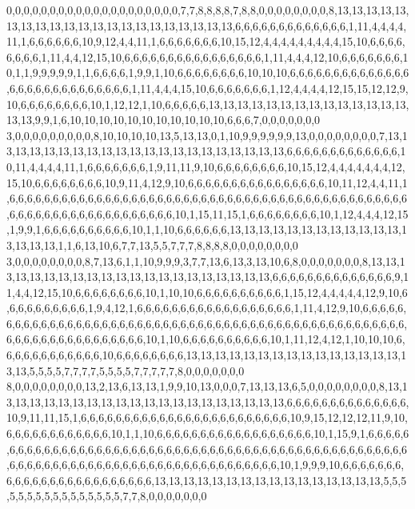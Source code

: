 0,0,0,0,0,0,0,0,0,0,0,0,0,0,0,0,0,0,0,0,7,7,8,8,8,8,7,8,8,0,0,0,0,0,0,0,0,8,13,13,13,13,13,13,13,13,13,13,13,13,13,13,13,13,13,13,13,13,13,6,6,6,6,6,6,6,6,6,6,6,6,6,1,11,4,4,4,4,11,1,6,6,6,6,6,6,10,9,12,4,4,11,1,6,6,6,6,6,6,6,10,15,12,4,4,4,4,4,4,4,4,4,15,10,6,6,6,6,6,6,6,6,1,11,4,4,12,15,10,6,6,6,6,6,6,6,6,6,6,6,6,6,6,6,6,1,11,4,4,4,12,10,6,6,6,6,6,6,6,10,1,1,9,9,9,9,9,1,1,6,6,6,6,1,9,9,1,10,6,6,6,6,6,6,6,6,10,10,10,6,6,6,6,6,6,6,6,6,6,6,6,6,6,6,6,6,6,6,6,6,6,6,6,6,6,6,6,1,11,4,4,4,15,10,6,6,6,6,6,6,6,1,12,4,4,4,4,12,15,15,12,12,9,10,6,6,6,6,6,6,6,6,10,1,12,12,1,10,6,6,6,6,6,13,13,13,13,13,13,13,13,13,13,13,13,13,13,13,13,9,9,1,6,10,10,10,10,10,10,10,10,10,10,10,6,6,6,7,0,0,0,0,0,0,0
3,0,0,0,0,0,0,0,0,0,8,10,10,10,10,13,5,13,13,0,1,10,9,9,9,9,9,9,13,0,0,0,0,0,0,0,0,7,13,13,13,13,13,13,13,13,13,13,13,13,13,13,13,13,13,13,13,13,13,6,6,6,6,6,6,6,6,6,6,6,6,6,10,11,4,4,4,4,11,1,6,6,6,6,6,6,6,1,9,11,11,9,10,6,6,6,6,6,6,6,6,10,15,12,4,4,4,4,4,4,4,12,15,10,6,6,6,6,6,6,6,6,10,9,11,4,12,9,10,6,6,6,6,6,6,6,6,6,6,6,6,6,6,6,6,10,11,12,4,4,11,1,6,6,6,6,6,6,6,6,6,6,6,6,6,6,6,6,6,6,6,6,6,6,6,6,6,6,6,6,6,6,6,6,6,6,6,6,6,6,6,6,6,6,6,6,6,6,6,6,6,6,6,6,6,6,6,6,6,6,6,6,6,6,6,6,6,10,1,15,11,15,1,6,6,6,6,6,6,6,6,10,1,12,4,4,4,12,15,1,9,9,1,6,6,6,6,6,6,6,6,6,6,10,1,1,10,6,6,6,6,6,6,13,13,13,13,13,13,13,13,13,13,13,13,13,13,13,13,1,1,6,13,10,6,7,7,13,5,5,7,7,7,8,8,8,8,0,0,0,0,0,0,0,0
3,0,0,0,0,0,0,0,0,8,7,13,6,1,1,10,9,9,9,3,7,7,13,6,13,3,13,10,6,8,0,0,0,0,0,0,0,8,13,13,13,13,13,13,13,13,13,13,13,13,13,13,13,13,13,13,13,13,13,6,6,6,6,6,6,6,6,6,6,6,6,6,6,9,11,4,4,12,15,10,6,6,6,6,6,6,6,6,10,1,10,10,6,6,6,6,6,6,6,6,6,6,1,15,12,4,4,4,4,4,12,9,10,6,6,6,6,6,6,6,6,6,6,1,9,4,12,1,6,6,6,6,6,6,6,6,6,6,6,6,6,6,6,6,6,6,1,11,4,12,9,10,6,6,6,6,6,6,6,6,6,6,6,6,6,6,6,6,6,6,6,6,6,6,6,6,6,6,6,6,6,6,6,6,6,6,6,6,6,6,6,6,6,6,6,6,6,6,6,6,6,6,6,6,6,6,6,6,6,6,6,6,6,6,6,6,6,6,6,10,1,10,6,6,6,6,6,6,6,6,6,6,10,1,11,12,4,12,1,10,10,10,6,6,6,6,6,6,6,6,6,6,6,6,10,6,6,6,6,6,6,6,6,13,13,13,13,13,13,13,13,13,13,13,13,13,13,13,13,13,5,5,5,5,7,7,7,7,5,5,5,5,7,7,7,7,7,8,0,0,0,0,0,0,0
8,0,0,0,0,0,0,0,0,13,2,13,6,13,13,1,9,9,10,13,0,0,0,7,13,13,13,6,5,0,0,0,0,0,0,0,0,8,13,13,13,13,13,13,13,13,13,13,13,13,13,13,13,13,13,13,13,13,13,6,6,6,6,6,6,6,6,6,6,6,6,6,6,10,9,11,11,15,1,6,6,6,6,6,6,6,6,6,6,6,6,6,6,6,6,6,6,6,6,6,6,6,6,10,9,15,12,12,12,11,9,10,6,6,6,6,6,6,6,6,6,6,6,6,10,1,1,10,6,6,6,6,6,6,6,6,6,6,6,6,6,6,6,6,6,6,10,1,15,9,1,6,6,6,6,6,6,6,6,6,6,6,6,6,6,6,6,6,6,6,6,6,6,6,6,6,6,6,6,6,6,6,6,6,6,6,6,6,6,6,6,6,6,6,6,6,6,6,6,6,6,6,6,6,6,6,6,6,6,6,6,6,6,6,6,6,6,6,6,6,6,6,6,6,6,6,6,6,6,6,6,6,6,10,1,9,9,9,10,6,6,6,6,6,6,6,6,6,6,6,6,6,6,6,6,6,6,6,6,6,6,6,6,13,13,13,13,13,13,13,13,13,13,13,13,13,13,13,13,5,5,5,5,5,5,5,5,5,5,5,5,5,5,5,5,7,7,8,0,0,0,0,0,0,0
